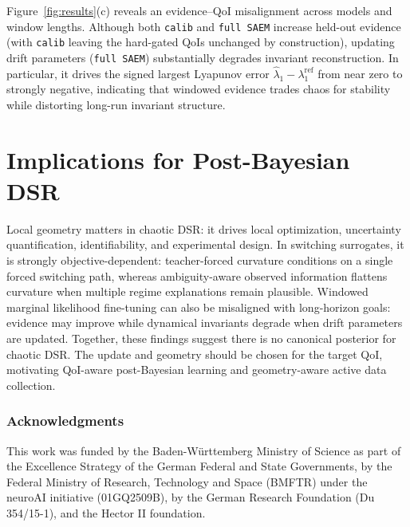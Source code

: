 \documentclass[twoside]{article}
\theoremstyle{plain}
\theoremstyle{definition}
\theoremstyle{remark}
\begin{document}
Figure~\ref{fig:results}(c) reveals an evidence–QoI misalignment across models and window lengths. Although both \texttt{calib} and \texttt{full SAEM} increase held-out evidence (with \texttt{calib} leaving the hard-gated QoIs unchanged by construction), updating drift parameters (\texttt{full SAEM}) substantially degrades invariant reconstruction. In particular, it drives the signed largest Lyapunov error $\widehat{\lambda}_1-\lambda_1^{\mathrm{ref}}$
from near zero to strongly negative, indicating that windowed evidence trades chaos for stability while distorting long-run invariant structure. 
\vspace{-0.5em}
\section{Implications for Post-Bayesian DSR}
\vspace{-0.5em}
Local geometry matters in chaotic DSR: it drives local optimization, uncertainty quantification, identifiability, and experimental design. In switching surrogates, it is strongly objective-dependent: teacher-forced curvature conditions on a single forced switching path, whereas ambiguity-aware observed information flattens curvature when multiple regime explanations remain plausible. Windowed marginal likelihood fine-tuning can also be misaligned with long-horizon goals: evidence may improve while dynamical invariants degrade when drift parameters are updated. Together, these findings suggest there is no canonical posterior for chaotic DSR. The update and geometry should be chosen for the target QoI, motivating QoI-aware post-Bayesian learning and geometry-aware active data collection.


\subsubsection*{Acknowledgments}
This work was funded by the Baden-Württemberg Ministry of Science as part of the Excellence Strategy of the German Federal and State Governments, by the Federal Ministry of Research, Technology and Space (BMFTR) under the neuroAI initiative (01GQ2509B), by the German Research Foundation (Du 354/15-1), and the Hector II foundation.




\clearpage
\onecolumn

\renewcommand{\thesection}{A\arabic{section}}
\renewcommand{\thesubsection}{A\arabic{section}.\arabic{subsection}}
\renewcommand{\theequation}{A\arabic{equation}}
\renewcommand{\thealgorithm}{A\arabic{algorithm}}
\renewcommand{\theproposition}{A\arabic{proposition}}
\renewcommand{\theremark}{A\arabic{remark}}
\end{document}
